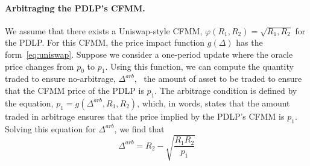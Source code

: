 

\paragraph{Arbitraging the PDLP's CFMM.}
We assume that there exists a Uniswap-style CFMM, $\varphi(R_1, R_2) = \sqrt{R_1, R_2}$ for the PDLP. 
For this CFMM, the price impact function $g(\Delta)$ has the form~\eqref{eq:uniswap}.
Suppose we consider a one-period update where the oracle price changes from $p_0$ to $p_1$.
Using this function, we can compute the quantity traded to ensure no-arbitrage, $\Delta^{arb}$, \ie~the amount of asset to be traded to ensure that the CFMM price of the PDLP is $p_1$.
The arbitrage condition is defined by the equation, $p_1 = g(\Delta^{arb}, R_1, R_2)$, which, in words, states that the amount traded in arbitrage ensures that the price implied by the PDLP's CFMM is $p_1$.
Solving this equation for $\Delta^{arb}$, we find that 
\begin{equation}\label{eq:arb-qty}
\Delta^{arb} = R_2 - \sqrt{\frac{R_1 R_2}{p_1}}
\end{equation}

